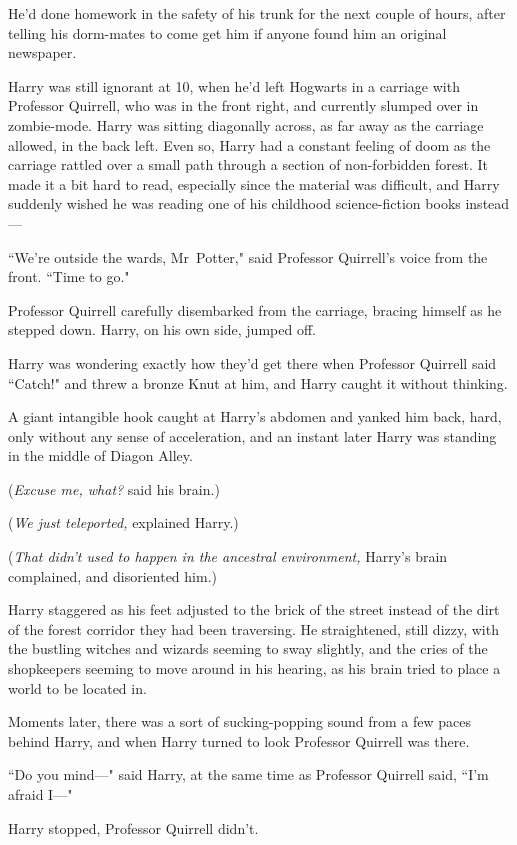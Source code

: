 He'd done homework in the safety of his trunk for the next couple of hours, after telling his dorm-mates to come get him if anyone found him an original newspaper.

Harry was still ignorant at 10\am, when he'd left Hogwarts in a carriage with Professor Quirrell, who was in the front right, and currently slumped over in zombie-mode. Harry was sitting diagonally across, as far away as the carriage allowed, in the back left. Even so, Harry had a constant feeling of doom as the carriage rattled over a small path through a section of non-forbidden forest. It made it a bit hard to read, especially since the material was difficult, and Harry suddenly wished he was reading one of his childhood science-fiction books instead—

``We're outside the wards, Mr~Potter," said Professor Quirrell's voice from the front. ``Time to go."

Professor Quirrell carefully disembarked from the carriage, bracing himself as he stepped down. Harry, on his own side, jumped off.

Harry was wondering exactly how they'd get there when Professor Quirrell said ``Catch!" and threw a bronze Knut at him, and Harry caught it without thinking.

A giant intangible hook caught at Harry's abdomen and yanked him back, hard, only without any sense of acceleration, and an instant later Harry was standing in the middle of Diagon Alley.

(\emph{Excuse me, what?} said his brain.)

(\emph{We just teleported,} explained Harry.)

(\emph{That didn't used to happen in the ancestral environment,} Harry's brain complained, and disoriented him.)

Harry staggered as his feet adjusted to the brick of the street instead of the dirt of the forest corridor they had been traversing. He straightened, still dizzy, with the bustling witches and wizards seeming to sway slightly, and the cries of the shopkeepers seeming to move around in his hearing, as his brain tried to place a world to be located in.

Moments later, there was a sort of sucking-popping sound from a few paces behind Harry, and when Harry turned to look Professor Quirrell was there.

``Do you mind—" said Harry, at the same time as Professor Quirrell said, ``I'm afraid I—"

Harry stopped, Professor Quirrell didn't.

